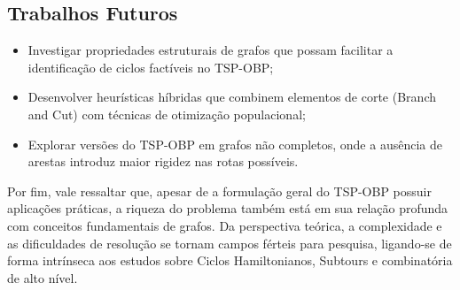 \documentclass[12pt, a4paper]{report}
\begin{document}
\subsection*{Trabalhos Futuros}
\begin{itemize}
    \item Investigar propriedades estruturais de grafos que possam facilitar a identificação de ciclos factíveis no TSP-OBP;
    \item Desenvolver heurísticas híbridas que combinem elementos de corte (Branch and Cut) com técnicas de otimização populacional;
    \item Explorar versões do TSP-OBP em grafos não completos, onde a ausência de arestas introduz maior rigidez nas rotas possíveis.
\end{itemize}

Por fim, vale ressaltar que, apesar de a formulação geral do TSP-OBP possuir aplicações práticas, a riqueza do problema também está em sua relação profunda com conceitos fundamentais de grafos. Da perspectiva teórica, a complexidade e as dificuldades de resolução se tornam campos férteis para pesquisa, ligando-se de forma intrínseca aos estudos sobre Ciclos Hamiltonianos, Subtours e combinatória de alto nível.

\newpage
\renewcommand{\refname}{Referências Bibliográficas}

\nocite{gomes2016, gomes2018, salvador, machado, ramos, carnielli}
\end{document}
